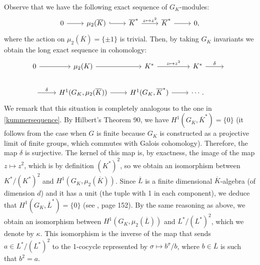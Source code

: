 \documentclass[a4paper, 12pt]{amsart}
\theoremstyle{definition}
\theoremstyle{plain}
\theoremstyle{plain}
\theoremstyle{plain}
\theoremstyle{plain}
\theoremstyle{remark}
\theoremstyle{remark}
\theoremstyle{plain}
\begin{document}
Observe that we have the following exact sequence of $G_K$-modules:
\begin{equation*}
	\begin{tikzcd}
		0\arrow{r}
		&\mu_2(\overline{K})\arrow[hook]{r}
		&\overline{K}^*\arrow{r}{z\mapsto z^2}
		&\overline{K}^*\arrow{r}
		&0,
	\end{tikzcd}
\end{equation*}
where the action on $\mu_2(\overline{K})=\{\pm1\}$ is trivial. Then, by taking $G_K$ invariants we obtain the long exact sequence in cohomology:
\begin{equation*}
	\begin{tikzcd}
		0\arrow{r}
		&\mu_2(K)\arrow{r}
		&K^*\arrow{r}{z\mapsto z^2}
		&K^*\arrow{r}{\delta}
		&\phantom{ }
		\\ \arrow{r}{\delta}
		&H^1(G_K,\mu_2(\overline{K}))\arrow{r}
		&H^1(G_K,\overline{K}^*)\arrow{r}
		& \cdots.
	\end{tikzcd}
\end{equation*}
	We remark that this situation is completely analogous to the one in \eqref{kummersequence}. By Hilbert's Theorem 90, we have $H^1(G_K,\overline{K}^*)=\{0\}$ (it follows from the case when $G$ is finite because $G_K$ is constructed as a projective limit of finite groups, which commutes with Galois cohomology). Therefore, the map $\delta$ is surjective. The kernel of this map is, by exactness, the image of the map $z\mapsto z^2$, which is by definition $(K^*)^2$, so we obtain an isomorphism between $K^*/(K^*)^2$ and $H^1(G_K,\mu_2(\overline{K}))$. Since $\overline{L}$ is a finite dimensional $\overline{K}$-algebra (of dimension $d$) and it has a unit (the tuple with 1 in each component), we deduce that $H^1(G_K,\overline{L}^*)=\{0\}$ (see \cite{Serre_1979}, page 152). By the same reasoning as above, we obtain an isomorphism between $H^1(G_K,\mu_2(\overline{L}))$ and $L^*/(L^*)^2$, which we denote by $\kappa$. This isomorphism is the inverse of the map that sends $a\in L^*/(L^*)^2$ to the 1-cocycle represented by $\sigma\mapsto b^\sigma/b$, where $b\in\overline{L}$ is such that $b^2=a$.
	
\end{document}
